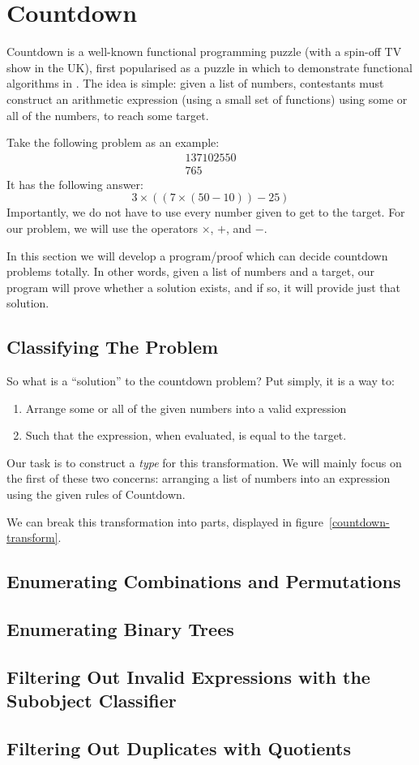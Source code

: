\chapter{Countdown}

Countdown is a well-known functional programming puzzle (with a spin-off TV show
in the UK), first popularised as a puzzle in which to demonstrate functional
algorithms in \cite{huttonCountdownProblem2002}.
The idea is simple: given a list of numbers, contestants must construct an
arithmetic expression (using a small set of functions) using some or all of the
numbers, to reach some target.

Take the following problem as an example:
\begin{gather*}
  \boxed{1} \boxed{3} \boxed{7} \boxed{10} \boxed{25} \boxed{50} \\
  \boxed{765} \tag{Target}
\end{gather*}
It has the following answer:
\begin{equation}
  3 \times ((7 \times (50 - 10)) - 25)
\end{equation}
Importantly, we do not have to use every number given to get to the target.
For our problem, we will use the operators \(\times\), \(+\), and \(-\).

In this section we will develop a program/proof which can decide countdown
problems totally.
In other words, given a list of numbers and a target, our program will prove
whether a solution exists, and if so, it will provide just that solution.
\section{Classifying The Problem}
So what is a ``solution'' to the countdown problem?
Put simply, it is a way to:
\begin{enumerate}
  \item Arrange some or all of the given numbers into a valid expression
  \item Such that the expression, when evaluated, is equal to the target.
\end{enumerate}
Our task is to construct a \emph{type} for this transformation.
We will mainly focus on the first of these two concerns: arranging a list of
numbers into an expression using the given rules of Countdown.

We can break this transformation into parts, displayed in
figure~\ref{countdown-transform}.
\section{Enumerating Combinations and Permutations}
\section{Enumerating Binary Trees}
\section{Filtering Out Invalid Expressions with the Subobject Classifier}
\section{Filtering Out Duplicates with Quotients}


